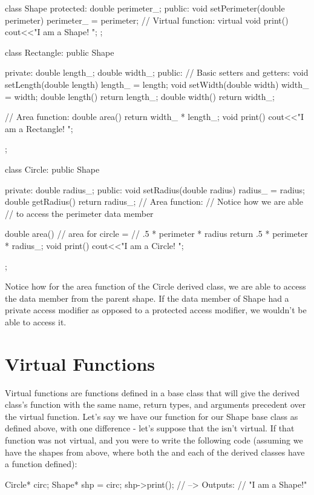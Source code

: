 \documentclass{tufte-handout}
\begin{document}
\begin{Code}
class Shape{
    protected:
        double perimeter_;
    public:
        void setPerimeter(double perimeter){
            perimeter_ = perimeter;
        }
        // Virtual function:
        virtual void print(){
            cout<<"I am a Shape! \n";
        }
};

class Rectangle: public Shape {
    private:
        double length_;
        double width_;
    public:
        // Basic setters and getters:
        void setLength(double length){
            length_ = length;
        }
        void setWidth(double width){
            width_ = width;
        }
        double length(){
            return length_;
        }
        double width(){
            return width_;
        }
        
        // Area function:
        double area(){
            return width_ * length_;
        }
        void print(){
            cout<<"I am a Rectangle! \n";
        }
        
};

class Circle: public Shape {
    private:
        double radius_;
    public:
        void setRadius(double radius){
            radius_ = radius;
        }
        double getRadius(){
            return radius_;
        }
        // Area function:
        // Notice how we are able
        // to access the perimeter data member
        
        double area(){
            // area for circle = 
            // .5 * perimeter * radius
            return .5 * perimeter * radius_;
        }
        void print(){
            cout<<"I am a Circle! \n";
        }
};
            
\end{Code}
Notice how for the area function of the Circle derived class, we are able to access the  data member from the parent shape.
If the  data member of Shape had a private access modifier as opposed to a protected access modifier, we wouldn't be able to access it.


\section{Virtual Functions}

Virtual functions are functions defined in a base class that will give the derived class's function with the same name, return types, and arguments precedent over the virtual function.
Let's say we have our  function for our Shape base class as defined above, with one difference - let's suppose that the  isn't virtual.
If that function was not virtual, and you were to write the following code (assuming we have the shapes from above, where both the  and each of the derived classes have a  function defined):
\begin{Code}
    Circle* circ;
    Shape* shp = circ;
    shp->print();
    // --> Outputs:
    // "I am a Shape!"
    
\end{Code}
\end{document}
